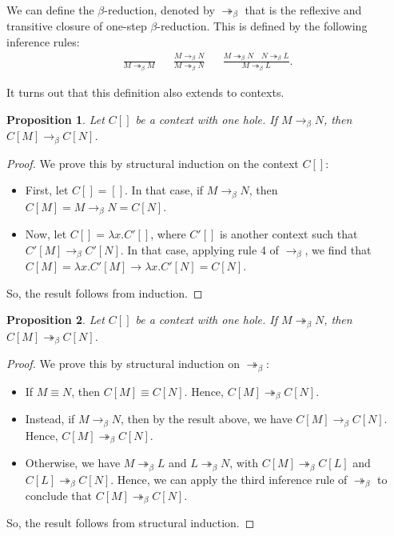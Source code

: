 \documentclass[a4paper, openany]{memoir}
\newtheorem{proposition}{Proposition}[section]
\theoremstyle{definition}
\begin{document}
    We can define the $\beta$-reduction, denoted by $\twoheadrightarrow_\beta$ that is the reflexive and transitive closure of one-step $\beta$-reduction. This is defined by the following inference rules:
    \begin{align*}
        \frac{}{M \twoheadrightarrow_\beta M} && \frac{M \to_\beta N}{M \twoheadrightarrow_\beta N} && \frac{M \twoheadrightarrow_\beta N \quad N \twoheadrightarrow_\beta L}{M \twoheadrightarrow_\beta L}.
    \end{align*}

    It turns out that this definition also extends to contexts.
    \begin{proposition}
        Let $C[]$ be a context with one hole. If $M \to_\beta N$, then $C[M] \to_\beta C[N]$.
    \end{proposition}
    \begin{proof}
        We prove this by structural induction on the context $C[]$:
        \begin{itemize}
            \item First, let $C[] = []$. In that case, if $M \to_\beta N$, then $C[M] = M \to_\beta N = C[N]$.
            \item Now, let $C[] = \lambda x.C'[]$, where $C'[]$ is another context such that $C'[M] \to_\beta C'[N]$. In that case, applying rule 4 of $\to_\beta$, we find that $C[M] = \lambda x.C'[M] \to \lambda x.C'[N] = C[N]$.
        \end{itemize}
        So, the result follows from induction.
    \end{proof}
    \begin{proposition}
        Let $C[]$ be a context with one hole.  If $M \twoheadrightarrow_\beta N$, then $C[M] \twoheadrightarrow_\beta C[N]$.
    \end{proposition}
    \begin{proof}
        We prove this by structural induction on $\twoheadrightarrow_\beta$:
        \begin{itemize}
            \item If $M \equiv N$, then $C[M] \equiv C[N]$. Hence, $C[M] \twoheadrightarrow_\beta C[N]$.
            \item Instead, if $M \to_\beta N$, then by the result above, we have $C[M] \to_\beta C[N]$. Hence, $C[M] \twoheadrightarrow_\beta C[N]$.
            \item Otherwise, we have $M \twoheadrightarrow_\beta L$ and $L \twoheadrightarrow_\beta N$, with $C[M] \twoheadrightarrow_\beta C[L]$ and $C[L] \twoheadrightarrow_\beta C[N]$. Hence, we can apply the third inference rule of $\twoheadrightarrow_\beta$ to conclude that $C[M] \twoheadrightarrow_\beta C[N]$.
        \end{itemize}
        So, the result follows from structural induction.
    \end{proof}
    \newpage
\end{document}
